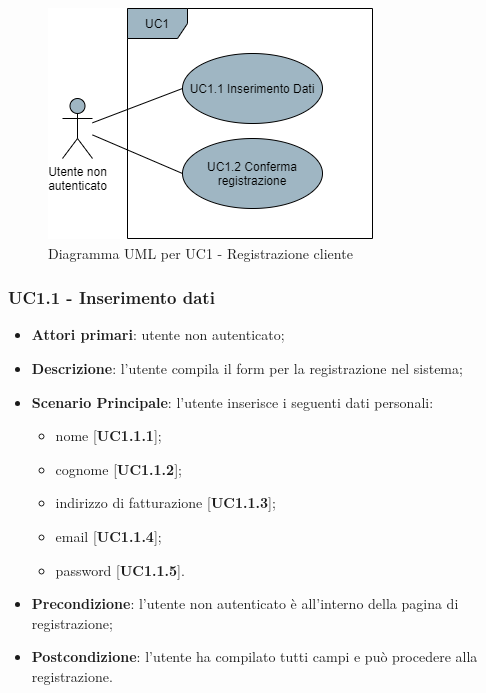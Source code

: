 \begin{figure}[H]
\centering
\includegraphics[scale=0.6]{res/UseCase/Immagini/Registrazione}
\caption{Diagramma UML per UC1 - Registrazione cliente}
\end{figure}

\subsubsection{UC1.1 - Inserimento dati}
\begin{itemize}
\item \textbf{Attori primari}: utente non autenticato;
\item \textbf{Descrizione}: l'utente compila il form per la registrazione nel sistema;
\item \textbf{Scenario Principale}: l'utente inserisce i seguenti dati personali:
\begin{itemize}
\item nome [\textbf{UC1.1.1}];
\item cognome [\textbf{UC1.1.2}];
\item indirizzo di fatturazione [\textbf{UC1.1.3}];
\item email [\textbf{UC1.1.4}];
\item password [\textbf{UC1.1.5}].
\end{itemize}
\item \textbf{Precondizione}: l'utente non autenticato è all'interno della pagina di registrazione;
\item \textbf{Postcondizione}: l'utente ha compilato tutti campi e può procedere alla registrazione.
\end{itemize}

